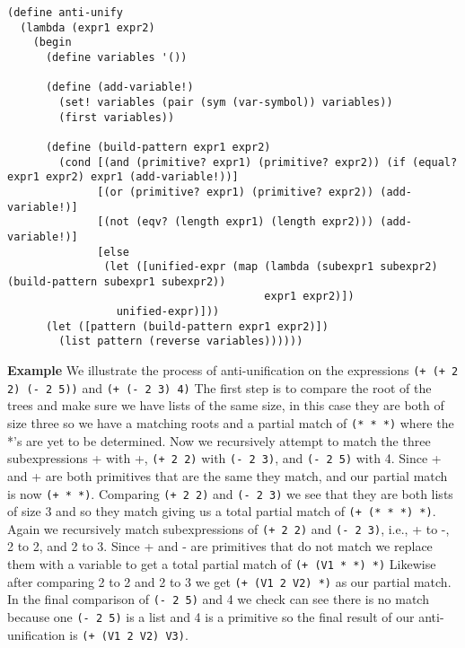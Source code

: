 \documentclass[a4paper,10pt]{article}
\begin{document}
\begin{lstlisting}[frame=trbl]
(define anti-unify
  (lambda (expr1 expr2)
    (begin
      (define variables '())

      (define (add-variable!)
        (set! variables (pair (sym (var-symbol)) variables))
        (first variables))
      
      (define (build-pattern expr1 expr2)
        (cond [(and (primitive? expr1) (primitive? expr2)) (if (equal? expr1 expr2) expr1 (add-variable!))]
              [(or (primitive? expr1) (primitive? expr2)) (add-variable!)]
              [(not (eqv? (length expr1) (length expr2))) (add-variable!)]
              [else
               (let ([unified-expr (map (lambda (subexpr1 subexpr2) (build-pattern subexpr1 subexpr2))
                                        expr1 expr2)])
                 unified-expr)]))
      (let ([pattern (build-pattern expr1 expr2)])
        (list pattern (reverse variables))))))
\end{lstlisting}

{\bf Example} We illustrate the process of anti-unification on the expressions \texttt{(+ (+ 2 2) (- 2 5))} and \texttt{(+ (- 2 3) 4)}
The first step is to compare the root of the trees and make sure we have lists of the same size, in this case they are both of size three so we have a matching roots and a partial match of \texttt{(* * *)} where the *'s are yet to be determined.
Now we recursively attempt to match the three subexpressions + with +, \texttt{(+ 2 2)} with \texttt{(- 2 3)}, and \texttt{(- 2 5)} with 4.
Since + and + are both primitives that are the same they match, and our partial match is now \texttt{(+ * *)}.
Comparing \texttt{(+ 2 2)} and \texttt{(- 2 3)} we see that they are both lists of size 3 and so they match giving us a total partial match of \texttt{(+ (* * *) *)}.
Again we recursively match subexpressions of \texttt{(+ 2 2)} and \texttt{(- 2 3)}, i.e., + to -, 2 to 2, and 2 to 3.
Since + and - are primitives that do not match we replace them with a variable to get a total partial match of \texttt{(+ (V1 * *) *)}
Likewise after comparing 2 to 2 and 2 to 3 we get \texttt{(+ (V1 2 V2) *)} as our partial match.
In the final comparison of \texttt{(- 2 5)} and 4 we check can see there is no match because one \texttt{(- 2 5)} is a list and 4 is a primitive so the final result of our anti-unification is \texttt{(+ (V1 2 V2) V3)}.
\end{document}
